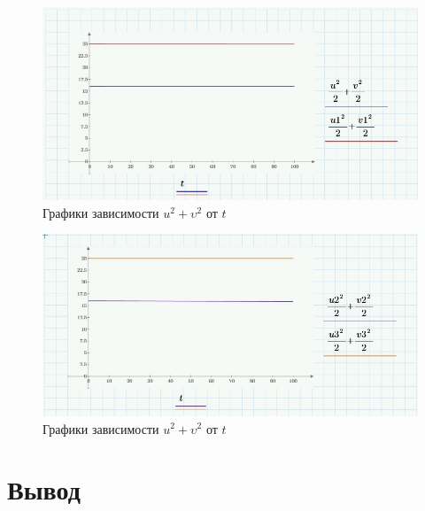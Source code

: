 \documentclass[a4paper, 14pt]{extarticle}
\begin{document}
		\begin{figure}[H]
			\centering
			\includegraphics[width = \linewidth]{2.jpg}
			\caption{Графики зависимости $u^2+\upsilon^2$ от $t$}
		\end{figure}
		\begin{figure}[H]
			\centering
			\includegraphics[width = \linewidth]{3.jpg}
			\caption{Графики зависимости $u^2+\upsilon^2$ от $t$}
		\end{figure}
		
	\section{Вывод}

		
\end{document}
